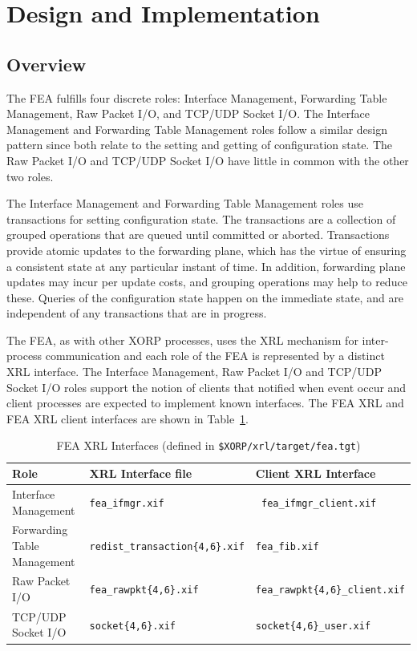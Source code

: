 \documentclass[11pt]{article}
\begin{document}
\section{Design and Implementation}
\label{sec:design_and_implementation}

\subsection{Overview}

The FEA fulfills four discrete roles: Interface Management, Forwarding
Table Management, Raw Packet I/O, and TCP/UDP Socket I/O.  The Interface
Management and Forwarding Table Management roles follow a similar
design pattern since both relate to the setting and getting of
configuration state.  The Raw Packet I/O and TCP/UDP Socket I/O have
little in common with the other two roles.

The Interface Management and Forwarding Table Management roles use
transactions for setting configuration state.  The transactions are a
collection of grouped operations that are queued until committed or
aborted.  Transactions provide atomic updates to the forwarding plane,
which has the virtue of ensuring a consistent state at any particular
instant of time.  In addition, forwarding plane updates may incur per
update costs, and grouping operations may help to reduce
these. Queries of the configuration state happen on the immediate
state, and are independent of any transactions that are in progress.

The FEA, as with other XORP processes, uses the XRL mechanism for
inter-process communication and each role of the FEA is represented by
a distinct XRL interface.  The Interface Management,
Raw Packet I/O and TCP/UDP Socket I/O roles support the notion of
clients that notified when event occur and client processes are expected
to implement known interfaces.  The FEA XRL and FEA XRL client
interfaces are shown in Table~\ref{tbl:xifs}.

\begin{table}[h]
\begin{center}
\begin{tabular}{|l|l|l|}\hline
Role & XRL Interface file & Client XRL Interface\\ \hline\hline
Interface Management 		& {\tt fea\_ifmgr.xif}	& {\tt
  fea\_ifmgr\_client.xif} \\
Forwarding Table Management	& {\tt redist\_transaction\{4,6\}.xif}	& {\tt fea\_fib.xif} \\
Raw Packet I/O	& {\tt fea\_rawpkt\{4,6\}.xif} & {\tt fea\_rawpkt\{4,6\}\_client.xif} \\
TCP/UDP Socket I/O & {\tt socket\{4,6\}.xif} & {\tt socket\{4,6\}\_user.xif} \\
\hline
\end{tabular}
\caption{FEA XRL Interfaces (defined in {\tt \$XORP/xrl/target/fea.tgt})}
\label{tbl:xifs}
\end{center}
\end{table}
\end{document}
